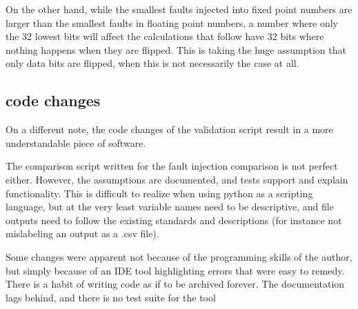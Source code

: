 On the other hand, while the smallest faults injected into fixed point numbers are larger than the smallest faults in floating point numbers, a number where only the 32 lowest bits will affect the calculations that follow have 32 bits where nothing happens when they are flipped. This is taking the huge assumption that only data bits are flipped, when this is not necessarily the case at all.




\subsection{code changes}

On a different note, the code changes of the validation script result in a more understandable piece of software.

The comparison script written for the fault injection comparison is not perfect either. However, the assumptions are documented, and tests support and explain functionality. This is difficult to realize when using python as a scripting language, but at the very least variable names need to be descriptive, and file outputs need to follow the existing standards and descriptions (for instance not mislabeling an output as a .csv file).

Some changes were apparent not because of the programming skills of the author, but simply because of an IDE tool highlighting errors that were easy to remedy. There is a habit of writing code as if to be archived forever. The documentation lags behind, and there is no test suite for the tool
